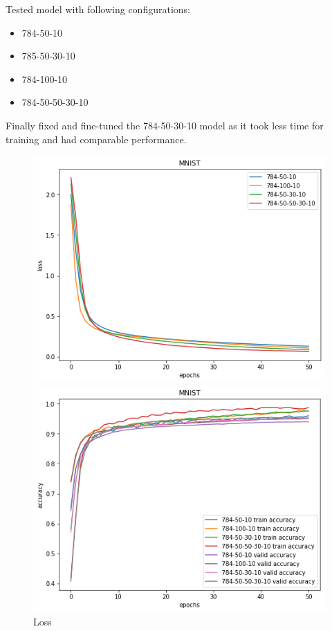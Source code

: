 \documentclass{article}
\begin{document}
Tested model with following configurations:
\begin{itemize}
	\item 784-50-10
	\item 785-50-30-10
	\item784-100-10
	\item 784-50-50-30-10
\end{itemize}

Finally fixed and fine-tuned the 784-50-30-10 model as it took less time for training and had comparable performance.

\begin{figure}[!htb]
	\includegraphics[width=\linewidth]{../output_plots/part_1_task_2_loss.png}
	\caption{Loss}\label{fig:part_1_task_2_loss}
	\endminipage\hfill
	\includegraphics[width=\linewidth]{../output_plots/part_1_task_2_accuracy.png}

\end{figure}
\end{document}
